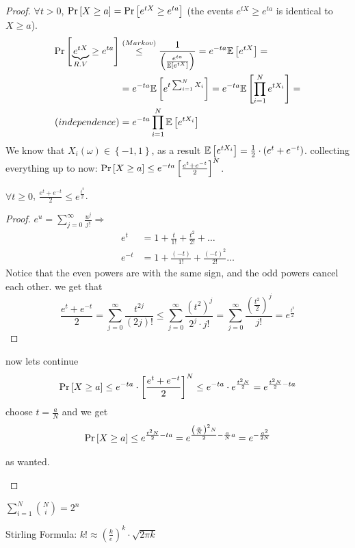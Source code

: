 \begin{proof}
$\forall t>0$, $\Pr\left[X\ge a\right]=\Pr\left[e^{tX}\ge e^{ta}\right]$ (the events $e^{tX}\ge e^{ta}$
is identical to $X\ge a$). 
\begin{align*}
\Pr\left[\underbrace{e^{tX}}_{R.V}\ge e^{ta}\right] & \overset{\left(Markov\right)}{\le}\frac{1}{\left(\frac{e^{ta}}{\mathbb{E}\left[e^{tX}\right]}\right)}=e^{-ta}\mathbb{E}\left[e^{tX}\right]=\\
 & =e^{-ta}\mathbb{E}\left[e^{t\sum_{i=1}^{N}X_{i}}\right]=e^{-ta}\mathbb{E}\left[\prod_{i=1}^{N}e^{tX_{i}}\right]=\\
\left(independence\right) & =e^{-ta}\prod_{i=1}^{N}\mathbb{E}\left[e^{tX_{i}}\right]
\end{align*}
 We know that $X_{i}\left(\omega\right)\in\left\{ -1,1\right\} $,
as a result $\mathbb{E}\left[e^{tX_{i}}\right]=\frac{1}{2}\cdot\left(e^{t}+e^{-t}\right)$.
collecting everything up to now: $\Pr\left[X\ge a\right]\le e^{-ta}\left[\frac{e^{t}+e^{-t}}{2}\right]^{N}$.
\begin{claim}
$\forall t\ge0$, $\frac{e^{t}+e^{-t}}{2}\le e^{\frac{t^{2}}{2}}$.
\begin{proof}
$e^{u}=\sum\limits _{j=0}^{\infty}\frac{u^{j}}{j!}\Rightarrow$ 
\begin{align*}
e^{t} & =1+\frac{t}{1!}+\frac{t^{2}}{2!}+\dots\\
e^{-t} & =1+\frac{(-t)}{1!}+\frac{(-t)^{2}}{2!}\dots
\end{align*}
 Notice that the even powers are with the same sign, and the odd powers
cancel each other. we get that
\[
\frac{e^{t}+e^{-t}}{2}=\sum\limits _{j=0}^{\infty}\frac{t^{2j}}{\left(2j\right)!}\le\sum\limits _{j=0}^{\infty}\frac{\left(t^{2}\right)^{j}}{2^{j}\cdot j!}=\sum\limits _{j=0}^{\infty}\frac{\left(\frac{t^{2}}{2}\right)^{j}}{j!}=e^{\frac{t^{2}}{2}}
\]
 
\end{proof}
now lets continue 
\[
\Pr\left[X\ge a\right]\le e^{-ta}\cdot\left[\frac{e^{t}+e^{-t}}{2}\right]^{N}\le e^{-ta}\cdot e^{\frac{t^{2}N}{2}}=e^{\frac{t^{2}N}{2}-ta}
\]
 choose $t=\frac{a}{N}$ and we get 
\[
\Pr\left[X\ge a\right]\le e^{\frac{t^{2}N}{2}-ta}=e^{\frac{\left(\frac{a}{N}\right)^{2}N}{2}-\frac{a}{N}a}=e^{-\frac{a^{2}}{2N}}
\]

as wanted.
\end{claim}

\end{proof}
%
\begin{fact}
$\sum_{i=1}^{N}\binom{N}{i}=2^{n}$
\end{fact}

\begin{fact}
Stirling Formula: $k!\approx\left(\frac{k}{e}\right)^{k}\cdot\sqrt{2\pi k}$ 
\end{fact}

